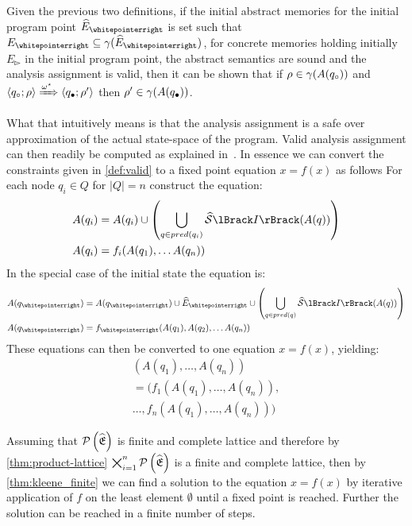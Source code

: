 Given the previous two definitions, if the initial abstract memories for the initial program point $\ab{E}_\whitepointerright$ is set such that $E_{\whitepointerright} \subseteq \concrete(\ab{E}_\whitepointerright)$, for concrete memories holding initially $E_{\whitepointerright}$ in the initial program point, the abstract semantics are sound and the analysis assignment is valid, then it can be shown that if $\rho \in \gamma(A(q_\circ))$ and $\langle q_\circ; \rho \rangle \xRightarrow{\omega^\star} \langle q_\bullet; \rho' \rangle$ then $\rho' \in \gamma(A(q_\bullet))$.

What that intuitively means is that the analysis assignment is a safe over approximation of the actual state-space of the program.
Valid analysis assignment can then readily be computed as explained in~\cite{nielson_formal_2019}.
In essence we can convert the constraints given in \autoref{def:valid} to a fixed point equation $x = f(x)$ as follows
For each node $q_i \in Q$ for $|Q| = n$ construct the equation:
\begin{align} \label{eq:q}
    A(q_i) &= A(q_i) \cup \left(\bigcup_{q \in pred(q_i)} \abssem{I}(A(q))\right) \\
    A(q_i) &= f_i(A(q_1), \dots A(q_n))
\end{align}
In the special case of the initial state the equation is:
\begin{align}
    A(q_\whitepointerright) &= A(q_\whitepointerright) \cup \ab{E}_\whitepointerright \cup  \left(\bigcup_{q \in pred(q)} \abssem{I}(A(q))\right) \\
    A(q_\whitepointerright) &= f_\whitepointerright(A(q_1), A(q_2), \dots A(q_n))
\end{align}
These equations can then be converted to one equation $x = f(x)$, yielding:
\begin{multline} \label{eq:constraint}
        (A(q_1), \dots, A(q_n)) \\
        = (f_1(A(q_1), \dots, A(q_n)), \\
        \dots, f_n(A(q_1), \dots, A(q_n)))
\end{multline}

Assuming that $\mathcal{P}\left(\widehat{\mathfrak{E}}\right)$ is finite and complete lattice and therefore by \autoref{thm:product-lattice} $\bigtimes_{i = 1}^n \mathcal{P}\left(\widehat{\mathfrak{E}}\right)$ is a finite and complete lattice, then by \autoref{thm:kleene_finite} we can find a solution to the equation $x = f(x)$ by iterative application of $f$ on the least element $\emptyset$ until a fixed point is reached.
Further the solution can be reached in a finite number of steps.
